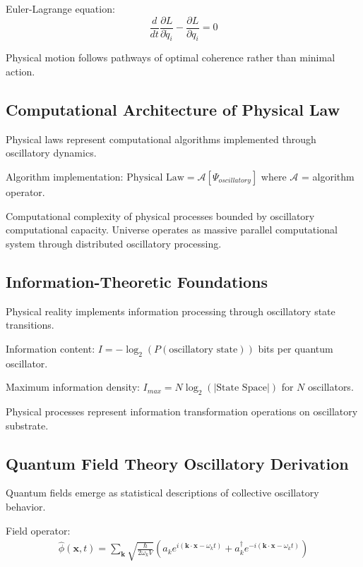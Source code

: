 \documentclass[12pt,a4paper]{article}
\begin{document}
Euler-Lagrange equation:
\begin{equation}
\frac{d}{dt}\frac{\partial L}{\partial \dot{q}_i} - \frac{\partial L}{\partial q_i} = 0
\end{equation}

Physical motion follows pathways of optimal coherence rather than minimal action.

\subsection{Computational Architecture of Physical Law}

Physical laws represent computational algorithms implemented through oscillatory dynamics.

Algorithm implementation: $\text{Physical Law} = \mathcal{A}[\Psi_{oscillatory}]$ where $\mathcal{A}$ = algorithm operator.

Computational complexity of physical processes bounded by oscillatory computational capacity. Universe operates as massive parallel computational system through distributed oscillatory processing.

\subsection{Information-Theoretic Foundations}

Physical reality implements information processing through oscillatory state transitions.

Information content: $I = -\log_2(P(\text{oscillatory state}))$ bits per quantum oscillator.

Maximum information density: $I_{max} = N \log_2(|\text{State Space}|)$ for $N$ oscillators.

Physical processes represent information transformation operations on oscillatory substrate.

\subsection{Quantum Field Theory Oscillatory Derivation}

Quantum fields emerge as statistical descriptions of collective oscillatory behavior.

Field operator:
\begin{multline}
\hat{\phi}(\mathbf{x},t) = \sum_{\mathbf{k}} \sqrt{\frac{\hbar}{2\omega_k V}} \left( a_k e^{i(\mathbf{k} \cdot \mathbf{x} - \omega_k t)} + a_k^\dagger e^{-i(\mathbf{k} \cdot \mathbf{x} - \omega_k t)} \right)
\end{multline}
\end{document}
